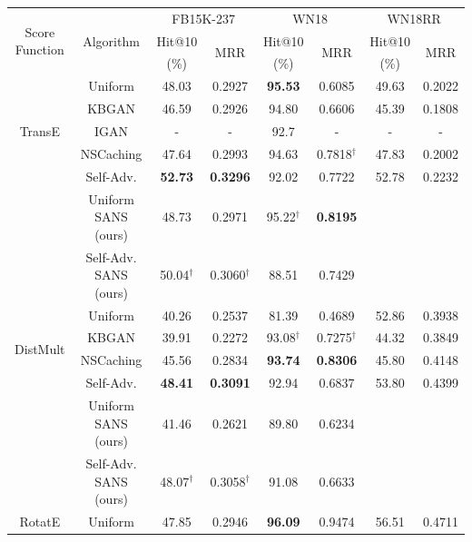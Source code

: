 \begin{table}[h]
\begin{small}
\centering
\begin{tabular}{cccccccc}
\hline
\multirow{3}{2cm}{\centering Score Function}& \multirow{3}{2cm}{Algorithm} & \multicolumn{2}{c}{FB15K-237} & \multicolumn{2}{c}{WN18} & \multicolumn{2}{c}{WN18RR} \\
& & Hit@10 & \multirow{2}{1cm}{\centering MRR} & Hit@10 & \multirow{2}{1cm}{\centering MRR} & Hit@10 & \multirow{2}{1cm}{\centering MRR} \\ 
& & (\%) & & (\%) & & (\%) & \\
\hline
\multirow{5}{1.5cm}{\centering TransE} & Uniform \cite{sun2019rotate} & 48.03 & 0.2927 & \textbf{95.53} & 0.6085 & 49.63 & 0.2022 \\
& KBGAN \cite{cai2017kbgan} & 46.59 & 0.2926 & 94.80 & 0.6606 & 45.39 & 0.1808 \\
& IGAN \cite{wang2018incorporating} & - & - & 92.7 & - & - & -\\
& NSCaching \cite{zhang2019nscaching} & 47.64 & 0.2993 & 94.63 & 0.7818$^\dagger$ & 47.83 & 0.2002\\
& Self-Adv. \cite{sun2019rotate} & \textbf{52.73} & \textbf{0.3296} & 92.02 & 0.7722 & 52.78 & 0.2232 \\
& Uniform SANS (ours) & 48.73 & 0.2971 & 95.22$^\dagger$ & \textbf{0.8195} \\
& Self-Adv. SANS (ours) & 50.04$^\dagger$ & 0.3060$^\dagger$ & 88.51 & 0.7429 \\
\hline
\multirow{4}{1.5cm}{\centering DistMult} & Uniform & 40.26 & 0.2537 & 81.39  & 0.4689 & 52.86 & 0.3938 \\
& KBGAN & 39.91 & 0.2272 & 93.08$^\dagger$ & 0.7275$^\dagger$ & 44.32 & 0.3849 \\
& NSCaching & 45.56 & 0.2834 & \textbf{93.74} & \textbf{0.8306} & 45.80 & 0.4148\\
& Self-Adv. & \textbf{48.41} & \textbf{0.3091} & 92.94  & 0.6837 & 53.80 & 0.4399 \\
& Uniform SANS (ours) & 41.46 & 0.2621 & 89.80 & 0.6234 \\
& Self-Adv. SANS (ours) & 48.07$^\dagger$ & 0.3058$^\dagger$ & 91.08  & 0.6633 \\
\hline
\multirow{3}{1cm}{\centering RotatE} & Uniform & 47.85 & 0.2946 & \textbf{96.09} & 0.9474 & 56.51 & 0.4711 \\

\end{tabular}
\end{small}
\end{table}
